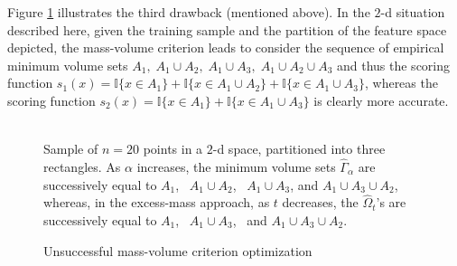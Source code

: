 Figure \ref{algo-problem} illustrates the third drawback (mentioned above). In the $2$-d situation described here, given the training sample and the partition of the feature space depicted, the mass-volume criterion leads to consider the sequence of empirical minimum volume sets $A_1,\; A_1\cup A_2,\; A_1\cup A_3,\; A_1\cup A_2\cup A_3$ and thus the scoring function $s_1(x)=\mathbb{I}\{x\in A_1  \}+ \mathbb{I}\{x\in A_1\cup A_2  \} + \mathbb{I}\{x\in A_1\cup A_3  \}$, whereas the scoring function $s_2(x)=\mathbb{I}\{x\in A_1  \}+ \mathbb{I}\{x\in A_1\cup A_3  \}$ is clearly more accurate.
\begin{center}
\begin{figure}[h!]
\centering
{}
\caption{Unsuccessful mass-volume criterion optimization}
\parbox{13cm}{~\\ \footnotesize Sample of $n=20$ points in a $2$-d space, partitioned into three rectangles.  As $\alpha$ increases, the minimum volume sets $\hat \Gamma_{\alpha}$ are successively equal to $A_1$,~ $A_1 \cup A_2$,~ $A_1 \cup A_3$, and $A_1 \cup A_3 \cup A_2$, whereas, in the excess-mass approach, as $t$ decreases, the $\hat \Omega_{t}$'s are successively equal to $A_1$,~ $A_1 \cup A_3$,~ and $A_1 \cup A_3 \cup A_2$.
}

\label{algo-problem}
\end{figure}
\end{center}



